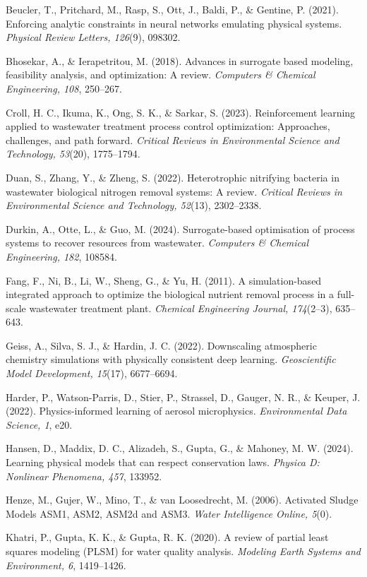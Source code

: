 \documentclass[11pt]{article}
\begin{document}
\noindent Beucler, T., Pritchard, M., Rasp, S., Ott, J., Baldi, P., \& Gentine, P. (2021). Enforcing analytic constraints in neural networks emulating physical systems. \textit{Physical Review Letters, 126}(9), 098302.

\noindent Bhosekar, A., \& Ierapetritou, M. (2018). Advances in surrogate based modeling, feasibility analysis, and optimization: A review. \textit{Computers \& Chemical Engineering, 108}, 250--267.

\noindent Croll, H. C., Ikuma, K., Ong, S. K., \& Sarkar, S. (2023). Reinforcement learning applied to wastewater treatment process control optimization: Approaches, challenges, and path forward. \textit{Critical Reviews in Environmental Science and Technology, 53}(20), 1775--1794.

\noindent Duan, S., Zhang, Y., \& Zheng, S. (2022). Heterotrophic nitrifying bacteria in wastewater biological nitrogen removal systems: A review. \textit{Critical Reviews in Environmental Science and Technology, 52}(13), 2302--2338.

\noindent Durkin, A., Otte, L., \& Guo, M. (2024). Surrogate-based optimisation of process systems to recover resources from wastewater. \textit{Computers \& Chemical Engineering, 182}, 108584.

\noindent Fang, F., Ni, B., Li, W., Sheng, G., \& Yu, H. (2011). A simulation-based integrated approach to optimize the biological nutrient removal process in a full-scale wastewater treatment plant. \textit{Chemical Engineering Journal, 174}(2--3), 635--643.

\noindent Geiss, A., Silva, S. J., \& Hardin, J. C. (2022). Downscaling atmospheric chemistry simulations with physically consistent deep learning. \textit{Geoscientific Model Development, 15}(17), 6677--6694.

\noindent Harder, P., Watson-Parris, D., Stier, P., Strassel, D., Gauger, N. R., \& Keuper, J. (2022). Physics-informed learning of aerosol microphysics. \textit{Environmental Data Science, 1}, e20.

\noindent Hansen, D., Maddix, D. C., Alizadeh, S., Gupta, G., \& Mahoney, M. W. (2024). Learning physical models that can respect conservation laws. \textit{Physica D: Nonlinear Phenomena, 457}, 133952.

\noindent Henze, M., Gujer, W., Mino, T., \& van Loosedrecht, M. (2006). Activated Sludge Models ASM1, ASM2, ASM2d and ASM3. \textit{Water Intelligence Online, 5}(0).

\noindent Khatri, P., Gupta, K. K., \& Gupta, R. K. (2020). A review of partial least squares modeling (PLSM) for water quality analysis. \textit{Modeling Earth Systems and Environment, 6}, 1419--1426.
\end{document}
